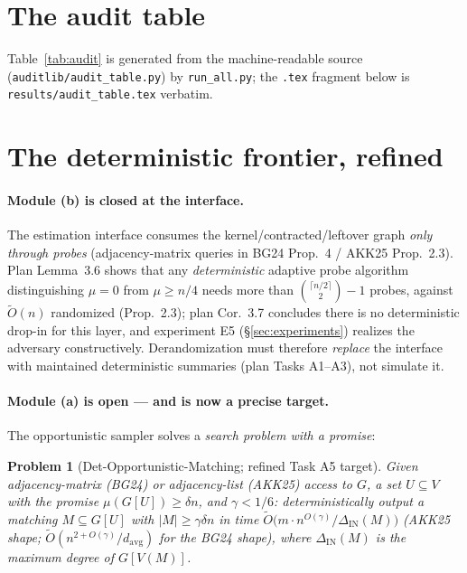 \documentclass[11pt]{article}
\newcommand{\Otilde}{\widetilde{O}}
\newtheorem{problem}{Problem}
\begin{document}
\section{The audit table}\label{sec:table}

Table~\ref{tab:audit} is generated from the machine-readable source
(\texttt{auditlib/audit\_table.py}) by \texttt{run\_all.py}; the
\texttt{.tex} fragment below is \texttt{results/audit\_table.tex} verbatim.



\section{The deterministic frontier, refined}\label{sec:frontier}

\paragraph{Module (b) is closed at the interface.} The estimation interface
consumes the kernel/contracted/leftover graph \emph{only through probes}
(adjacency-matrix queries in BG24 Prop.~4 / AKK25 Prop.~2.3). Plan
Lemma~3.6 shows that any \emph{deterministic} adaptive probe algorithm
distinguishing $\mu=0$ from $\mu\ge n/4$ needs more than
$\binom{\lceil n/2\rceil}{2}-1$ probes, against $\Otilde(n)$ randomized
(Prop.~2.3); plan Cor.~3.7 concludes there is no deterministic drop-in for
this layer, and experiment E5 (\S\ref{sec:experiments}) realizes the
adversary constructively. Derandomization must therefore \emph{replace} the
interface with maintained deterministic summaries (plan Tasks A1--A3), not
simulate it.

\paragraph{Module (a) is open --- and is now a precise target.} The
opportunistic sampler solves a \emph{search problem with a promise}:

\begin{problem}[Det-Opportunistic-Matching; refined Task A5 target]
\label{prob:detopp}
Given adjacency-matrix (BG24) or adjacency-list (AKK25) access to $G$, a set
$U\subseteq V$ with the promise $\mu(G[U])\ge\delta n$, and $\gamma<1/6$:
deterministically output a matching $M\subseteq G[U]$ with
$|M|\ge\gamma\delta n$ in time
$\Otilde\!\big(m\cdot n^{O(\gamma)}/\Delta_{\mathrm{IN}}(M)\big)$
(AKK25 shape; $\Otilde(n^{2+O(\gamma)}/d_{\mathrm{avg}})$ for the BG24
shape), where $\Delta_{\mathrm{IN}}(M)$ is the maximum degree of
$G[V(M)]$.
\end{problem}
\end{document}
